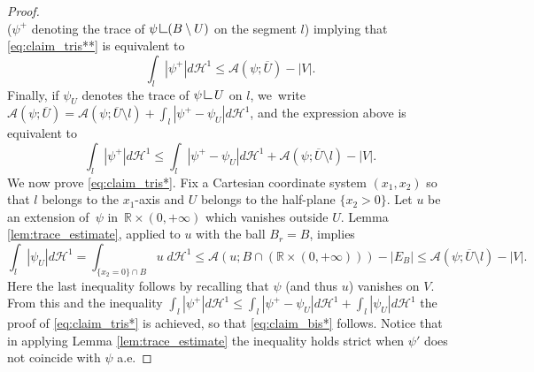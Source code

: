 \documentclass[11pt]{article}
\numberwithin{equation}{section}
\newcommand{\R}{\mathbb{R}}
\newcommand{\resa}{\mathop{\hbox{\vrule height 7pt width 0.5pt depth 0pt
\vrule height 0.5pt width 6pt depth 0pt}}\nolimits}
\newcommand{\resb}{\mathop{\hbox{\vrule height 4pt width 0.5pt depth 0pt
\vrule height 0.5pt width 3pt depth 0pt}}\nolimits}
\newcommand{\res}{\mathchoice{\resa}{\resa}{\resb}{\resb}}
\theoremstyle{definition}
\begin{document}
\begin{proof}
\[\]
($\psi^+$ denoting the trace of $\psi\res (B\setminus U)$ on the segment $l$) implying that \eqref{eq:claim_tris**} is equivalent to
\begin{equation*}
\int_l|{\psi}^+|d\mathcal H^1
\le\mathcal{A}(\psi;\overline U)-|V|.
\end{equation*}
Finally, if $\psi_U$ denotes the trace of $\psi\res U$ on $l$, we~write $\mathcal{A}(\psi;\overline U)=\mathcal{A}(\psi;\overline U\setminus l)+\int_l|\psi^+-\psi_U|d\mathcal H^1$, and the expression above is equivalent to
\begin{equation}\label{eq:claim_tris*}
\int_l|{\psi}^+|d\mathcal H^1
\le\int_l|\psi^+-\psi_U|d\mathcal H^1+\mathcal{A}(\psi;\overline U\setminus l)-|V|.
\end{equation}
We now prove \eqref{eq:claim_tris*}.
Fix a Cartesian coordinate system $(x_1,x_2)$ so that $l$ belongs to
the $x_1$-axis and $U$ belongs to the half-plane $\{x_2>0\}$. Let $u$ be an extension of~$\psi$ in~$\R\times(0,+\infty)$ which vanishes outside $U$.
Lemma \ref{lem:trace_estimate},
applied to $u$ with the ball $B_r=B$, implies
\[
 \int_l|{\psi}_U|d\mathcal H^1=\int_{\{x_2=0\}\cap B}u \;d\mathcal H^1\leq \mathcal A(u;B\cap (\R\times (0,+\infty)))-|E_B|\leq \mathcal A(\psi;\overline U\setminus l)-|V|.
\]
Here the last inequality follows by recalling that $\psi$ (and thus $u$) vanishes on $V$.
From this and the inequality $\int_l|{\psi}^+|d\mathcal H^1\leq \int_l|\psi^+-\psi_U|d\mathcal H^1+\int_l|{\psi}_U|d\mathcal H^1
$ the proof of \eqref{eq:claim_tris*} is achieved, so that \eqref{eq:claim_bis*} follows. Notice that in applying Lemma \ref{lem:trace_estimate} the inequality holds strict when $\psi'$ does not coincide with $\psi$ a.e.


\end{proof}
\end{document}
